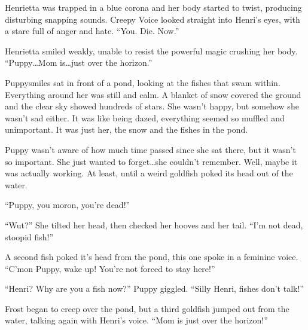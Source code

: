 Henrietta was trapped in a blue corona and her body started to twist, producing disturbing snapping sounds. Creepy Voice looked straight into Henri's eyes, with a stare full of anger and hate. ``You. Die. Now.''

Henrietta smiled weakly, unable to resist the powerful magic crushing her body. ``Puppy\dots Mom is\dots just over the horizon.''


\horizonline


Puppysmiles sat in front of a pond, looking at the fishes that swam within. Everything around her was still and calm. A blanket of snow covered the ground and the clear sky showed hundreds of stars. She wasn't happy, but somehow she wasn't sad either. It was like being dazed, everything seemed so muffled and unimportant. It was just her, the snow and the fishes in the pond.

Puppy wasn't aware of how much time passed since she sat there, but it wasn't so important. She just wanted to forget\dots she couldn't remember. Well, maybe it was actually working. At least, until a weird goldfish poked its head out of the water.

``Puppy, you moron, you're dead!''

``Wut?'' She tilted her head, then checked her hooves and her tail. ``I'm not dead, stoopid fish!''

A second fish poked it's head from the pond, this one spoke in a feminine voice. ``C'mon Puppy, wake up! You're not forced to stay here!''

``Henri? Why are you a fish now?'' Puppy giggled. ``Silly Henri, fishes don't talk!''

Frost began to creep over the pond, but a third goldfish jumped out from the water, talking again with Henri's voice. ``Mom is just over the horizon!''








